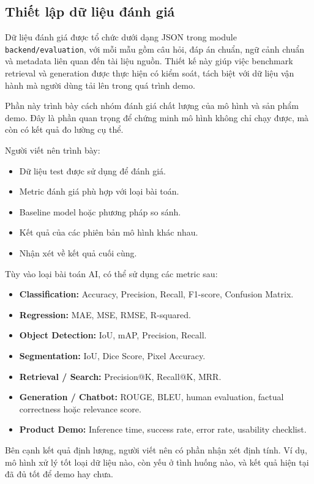 \documentclass[12pt]{ai_conquer2026}
\begin{document}
\subsection{Thiết lập dữ liệu đánh giá}

Dữ liệu đánh giá được tổ chức dưới dạng JSON trong module \texttt{backend/evaluation}, với mỗi mẫu gồm câu hỏi, đáp án chuẩn, ngữ cảnh chuẩn và metadata liên quan đến tài liệu nguồn. Thiết kế này giúp việc benchmark retrieval và generation được thực hiện có kiểm soát, tách biệt với dữ liệu vận hành mà người dùng tải lên trong quá trình demo.

Phần này trình bày cách nhóm đánh giá chất lượng của mô hình và sản phẩm demo. Đây là phần quan trọng để chứng minh mô hình không chỉ chạy được, mà còn có kết quả đo lường cụ thể.

Người viết nên trình bày:

\begin{itemize}
\item Dữ liệu test được sử dụng để đánh giá.
\item Metric đánh giá phù hợp với loại bài toán.
\item Baseline model hoặc phương pháp so sánh.
\item Kết quả của các phiên bản mô hình khác nhau.
\item Nhận xét về kết quả cuối cùng.
\end{itemize}

Tùy vào loại bài toán AI, có thể sử dụng các metric sau:

\begin{itemize}
\item \textbf{Classification:} Accuracy, Precision, Recall, F1-score, Confusion Matrix.
\item \textbf{Regression:} MAE, MSE, RMSE, R-squared.
\item \textbf{Object Detection:} IoU, mAP, Precision, Recall.
\item \textbf{Segmentation:} IoU, Dice Score, Pixel Accuracy.
\item \textbf{Retrieval / Search:} Precision@K, Recall@K, MRR.
\item \textbf{Generation / Chatbot:} ROUGE, BLEU, human evaluation, factual correctness hoặc relevance score.
\item \textbf{Product Demo:} Inference time, success rate, error rate, usability checklist.
\end{itemize}

Bên cạnh kết quả định lượng, người viết nên có phần nhận xét định tính. Ví dụ, mô hình xử lý tốt loại dữ liệu nào, còn yếu ở tình huống nào, và kết quả hiện tại đã đủ tốt để demo hay chưa.
\end{document}
